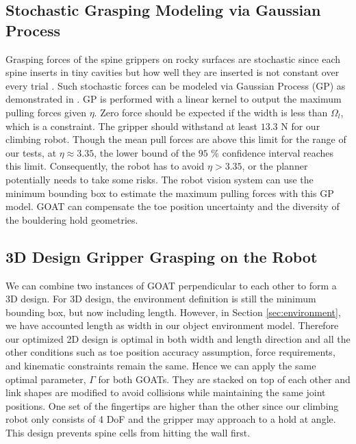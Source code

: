 \documentclass[letterpaper, 10 pt, conference]{ieeeconf}  %
\begin{document}
\subsection{Stochastic Grasping Modeling via Gaussian Process \label{sec:GP}}
Grasping forces of the spine grippers on rocky surfaces are stochastic since each spine inserts in tiny cavities but how well they are inserted is not constant over every trial \cite{climb_yuki}. Such stochastic forces can be modeled via Gaussian Process (GP) as demonstrated in \cite{risk_aware}. 
GP is performed with a linear kernel to output the maximum pulling forces given $\eta$. Zero force should be expected if the width is less than $\Omega_{l}$, which is a constraint. The gripper should withstand at least $13.3$ N for our climbing robot. Though the mean pull forces are above this limit for the range of our tests, at $\eta \approx 3.35$, the lower bound of the $95$ \% confidence interval reaches this limit. Consequently, the robot has to avoid $\eta > 3.35$, or the planner potentially needs to take some risks. The robot vision system can use the minimum bounding box to estimate the maximum pulling forces with this GP model. GOAT can compensate the toe position uncertainty and the diversity of the bouldering hold geometries.%


\subsection{3D Design Gripper Grasping on the Robot \label{sec:3D}}
We can combine two instances of GOAT perpendicular to each other to form a 3D design. For 3D design, the environment definition is still the minimum bounding box, but now including length. However, in Section \ref{sec:environment}, we have accounted length as width in our object environment model. Therefore our optimized 2D design is optimal in both width and length direction and all the other conditions such as toe position accuracy assumption, force requirements, and kinematic constraints remain the same.
Hence we can apply the same optimal parameter, $\Gamma$ for both GOATs.
They are stacked on top of each other and link shapes are modified to avoid collisions while maintaining the same joint positions. One set of the fingertips are higher than the other since our climbing robot only consists of 4 DoF and the gripper may approach to a hold at angle. This design prevents spine cells from hitting the wall first.%
\end{document}
